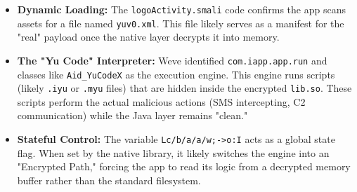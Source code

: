 \documentclass[
]{article}
\begin{document}
\begin{itemize}
\item
  \textbf{Dynamic Loading:} The \texttt{logoActivity.smali} code
  confirms the app scans assets for a file named \texttt{yuv0.xml}. This
  file likely serves as a manifest for the "real" payload once the
  native layer decrypts it into memory.
\item
  \textbf{The "Yu Code" Interpreter:} We\textquotesingle ve identified
  \texttt{com.iapp.app.run} and classes like \texttt{Aid\_YuCodeX} as
  the execution engine. This engine runs scripts (likely \texttt{.iyu}
  or \texttt{.myu} files) that are hidden inside the encrypted
  \texttt{lib.so}. These scripts perform the actual malicious actions
  (SMS intercepting, C2 communication) while the Java layer remains
  "clean."
\item
  \textbf{Stateful Control:} The variable
  \texttt{Lc/b/a/a/w;-\textgreater{}o:I} acts as a global state flag.
  When set by the native library, it likely switches the engine into an
  "Encrypted Path," forcing the app to read its logic from a decrypted
  memory buffer rather than the standard filesystem.
\end{itemize}
\end{document}
